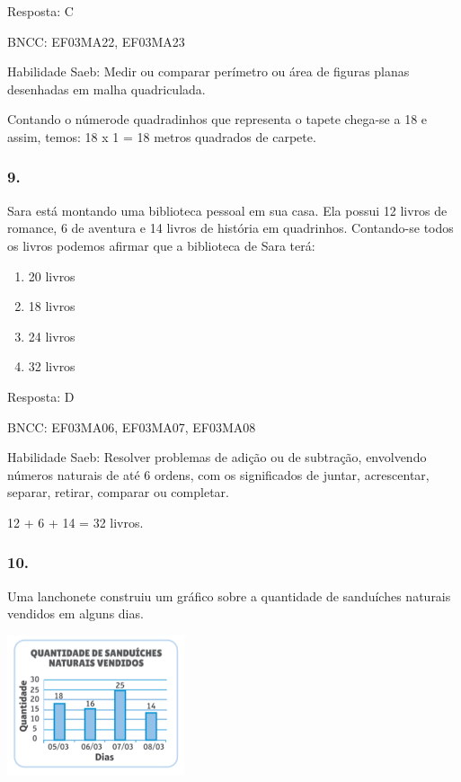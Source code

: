 Resposta: C

BNCC: EF03MA22, EF03MA23

Habilidade Saeb: Medir ou comparar perímetro ou área de figuras planas
desenhadas em malha quadriculada.

Contando o númerode quadradinhos que representa o tapete chega-se a 18 e
assim, temos: 18 x 1 = 18 metros quadrados de carpete.

\subsubsection{9.}\label{section-164}

Sara está montando uma biblioteca pessoal em sua casa. Ela possui 12
livros de romance, 6 de aventura e 14 livros de história em quadrinhos.
Contando-se todos os livros podemos afirmar que a biblioteca de Sara
terá:

\begin{enumerate}
\def\labelenumi{\alph{enumi})}
\item
  20 livros
\item
  18 livros
\item
  24 livros
\item
  32 livros
\end{enumerate}

Resposta: D

BNCC: EF03MA06, EF03MA07, EF03MA08

Habilidade Saeb: Resolver problemas de adição ou de subtração,
envolvendo números naturais de até 6 ordens, com os significados de
juntar, acrescentar, separar, retirar, comparar ou completar.

12 + 6 + 14 = 32 livros.

\subsubsection{10.}\label{section-165}

Uma lanchonete construiu um gráfico sobre a quantidade de sanduíches
naturais vendidos em alguns dias.

\includegraphics[width=2.05128in,height=1.61850in]{media/image124.png}

